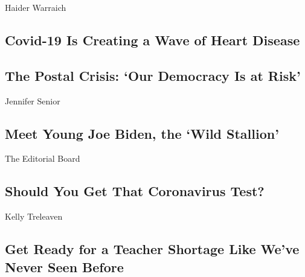 Haider Warraich

\hypertarget{covid-19-is-creating-a-wave-of-heart-disease}{%
\subsection{Covid-19 Is Creating a Wave of Heart
Disease}\label{covid-19-is-creating-a-wave-of-heart-disease}}

\href{/2020/08/17/opinion/letters/postal-service-election-democracy.html}{}

\hypertarget{the-postal-crisis-our-democracy-is-at-risk}{%
\subsection{The Postal Crisis: `Our Democracy Is at
Risk'}\label{the-postal-crisis-our-democracy-is-at-risk}}

\href{/2020/08/15/opinion/joe-biden-2020-1988-what-it-takes.html}{}

Jennifer Senior

\hypertarget{meet-young-joe-biden-the-wild-stallion}{%
\subsection{Meet Young Joe Biden, the `Wild
Stallion'}\label{meet-young-joe-biden-the-wild-stallion}}

\href{/2020/08/16/opinion/us-coronavirus-testing.html}{}

The Editorial Board

\hypertarget{should-you-get-that-coronavirus-test}{%
\subsection{Should You Get That Coronavirus
Test?}\label{should-you-get-that-coronavirus-test}}

\href{/2020/08/17/opinion/coronavirus-schools-teachers.html}{}

Kelly Treleaven

\hypertarget{get-ready-for-a-teacher-shortage-like-weve-never-seen-before}{%
\subsection{Get Ready for a Teacher Shortage Like We've Never Seen
Before}\label{get-ready-for-a-teacher-shortage-like-weve-never-seen-before}}

\href{/2020/08/17/opinion/thailand-protests.html}{}

